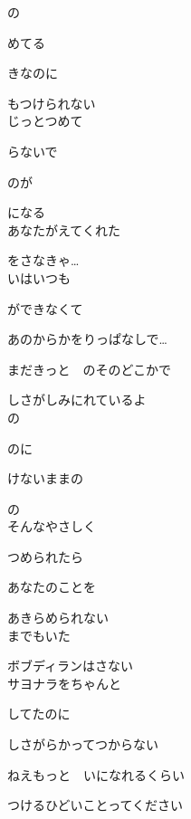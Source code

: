 の

めてる

きなのに

もつけられない
\\

じっとつめて

らないで

のが

になる
\\

あなたがえてくれた

をさなきゃ…
\\

いはいつも

ができなくて

あのからかをりっぱなしで…

まだきっと　のそのどこかで

しさがしみにれているよ
\\

の

のに

けないままの

の
\\

そんなやさしく

つめられたら

あなたのことを

あきらめられない
\\

までもいた

ボブディランはさない
\\

サヨナラをちゃんと

してたのに

しさがらかってつからない

ねえもっと　いになれるくらい

つけるひどいことってください
\\

